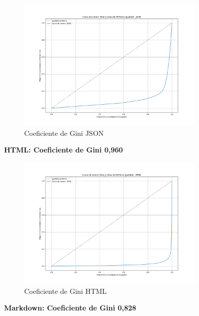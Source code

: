 \documentclass[a4paper, 12pt]{book}
\begin{document}
\begin{itemize}
\begin{itemize}
          \begin{figure}[H]
            \centering
            \includegraphics[width=0.8\textwidth]{img/curva_lorenz_total_JSON.png}
            \caption{Coeficiente de Gini JSON}
            \label{figura:ginigraficaJSON}
          \end{figure}

          \textbf{HTML: Coeficiente de Gini 0,960}

          \begin{figure}[H]
            \centering
            \includegraphics[width=0.8\textwidth]{img/curva_lorenz_total_HTML.png}
            \caption{Coeficiente de Gini HTML}
            \label{figura:ginigraficaHTML}
          \end{figure}

          \textbf{Markdown: Coeficiente de Gini 0,828}


\end{itemize}
\end{itemize}
\end{document}
